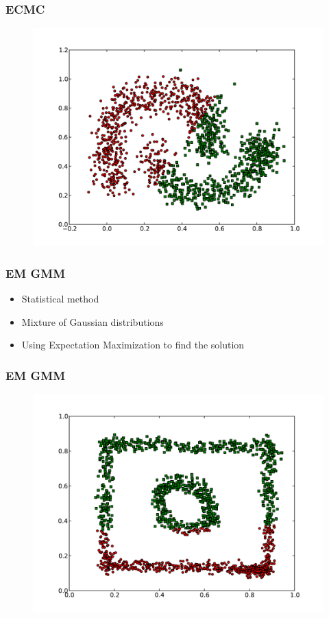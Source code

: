 \documentclass{beamer}
\begin{document}
\begin{frame}
\frametitle{ECMC}
    \begin{figure}[]
    \includegraphics[scale=0.5]{ECMC_half-moons.pdf}
    \end{figure}
\end{frame}



\begin{frame}
\frametitle{EM GMM}
    \begin{itemize}
    	\item Statistical method
   	\item Mixture of Gaussian distributions
   	\item Using Expectation Maximization to find the solution
    \end{itemize}
\end{frame}

\begin{frame}
\frametitle{EM GMM}
    \begin{figure}[]
    \includegraphics[scale=0.5]{GMM_circle-weird.pdf}
    \end{figure}
\end{frame}
\end{document}
